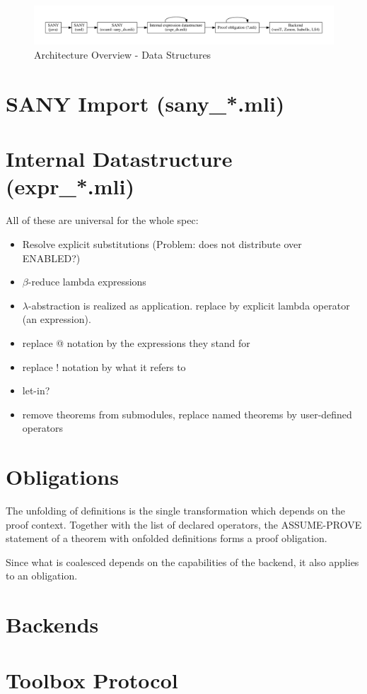 \documentclass[10pt,a4paper]{article}
\begin{document}
 \begin{figure}[htb]
   \centering
   \includegraphics[width=\textwidth]{architecture.pdf}
   \caption{Architecture Overview - Data Structures}
   \label{fig:datastructures}
 \end{figure}
\section{SANY Import (sany\_*.mli)}
\label{sec:sany}

\section{Internal Datastructure (expr\_*.mli)}
All of these are universal for the whole spec:
\label{sec:exprds}
\begin{itemize}
\item Resolve explicit substitutions
 (Problem: does not distribute over ENABLED?)
\item $\beta$-reduce lambda expressions
\item $\lambda$-abstraction is realized as application. replace by explicit
 lambda operator (an expression).
\item replace @ notation by the expressions they stand for
\item replace ! notation by what it refers to
\item  let-in?
\item remove theorems from submodules, replace named theorems by user-defined
 operators
\end{itemize}

\section{Obligations}
\label{sec:obligations}

The unfolding of definitions is the single transformation which depends on the
 proof context. Together with the list of declared operators, the ASSUME-PROVE
 statement of a theorem with onfolded definitions forms a proof obligation.

Since what is coalesced depends on the capabilities of the backend, it also
 applies to an obligation.
\section{Backends}
\label{sec:backends}

\section{Toolbox Protocol}
\label{sec:protocol}
\end{document}
